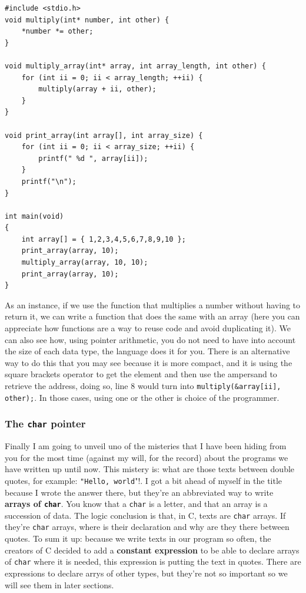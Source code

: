 \documentclass[a4paper]{article}
\begin{document}
\noindent
\begin{minipage}[H]{\linewidth}
\mbox{}
\begin{lstlisting}[style=C, label={lst:pointers4},
caption={Practical example of pointer arithmetic}]
#include <stdio.h>
void multiply(int* number, int other) {
    *number *= other;
}

void multiply_array(int* array, int array_length, int other) {
    for (int ii = 0; ii < array_length; ++ii) {
        multiply(array + ii, other);
    }
}

void print_array(int array[], int array_size) {
    for (int ii = 0; ii < array_size; ++ii) {
        printf(" %d ", array[ii]);
    }
    printf("\n");
}

int main(void)
{
    int array[] = { 1,2,3,4,5,6,7,8,9,10 };
    print_array(array, 10);
    multiply_array(array, 10, 10);
    print_array(array, 10);
}
\end{lstlisting}
\end{minipage}

As an instance, if we use the function that multiplies a number without having
to return it, we can write a function that does the same with an array (here
you can appreciate how functions are a way to reuse code and avoid duplicating
it). We can also see how, using pointer arithmetic, you do not need to have into
account the size of each data type, the language does it for you. There is an
alternative way to do this that you may see because it is more compact, and it
is using the square brackets operator to get the element and then use the
ampersand to retrieve the address, doing so, line 8 would turn into
\lstinline[style=C]{multiply(&array[ii], other);}. In those cases, using one
or the other is choice of the programmer.

\subsubsection{The \texttt{char} pointer}
Finally I am going to unveil uno of the misteries that I have been hiding from
you for the most time (against my will, for the record) about the programs we
have written up until now. This mistery is: what are those texts between double
quotes, for example: \verb!"Hello, world!"!. I got a bit ahead of myself in the
title because I wrote the answer there, but they're an abbreviated way to write
\textbf{arrays of \texttt{char}}. You know that a \verb!char! is a letter, and
that an array is a succession of data. The logic conclusion is that, in C, texts
are \verb!char! arrays. If they're \verb!char! arrays, where is their
declaration and why are they there between quotes. To sum it up: because we
write texts in our program so often, the creators of C decided to add a
\textbf{constant expression} to be able to declare arrays of \verb!char!
where it is needed, this expression is putting the text in quotes.
There are expressions to declare arrys of other types, but they're not so
important so we will see them in later sections.
\end{document}
